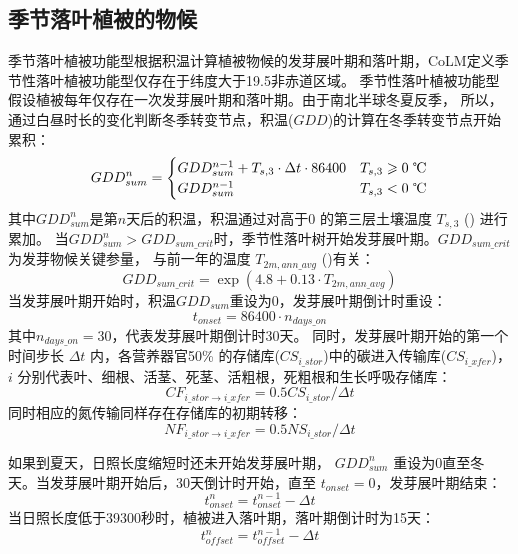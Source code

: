 \subsection{季节落叶植被的物候}\label{季节落叶植被的物候}
季节落叶植被功能型根据积温计算植被物候的发芽展叶期和落叶期，CoLM定义季节性落叶植被功能型仅存在于纬度大于19.5\textdegree 非赤道区域。
季节性落叶植被功能型假设植被每年仅存在一次发芽展叶期和落叶期。由于南北半球冬夏反季，
所以，通过白昼时长的变化判断冬季转变节点，积温($GDD$)的计算在冬季转变节点开始累积\citep{white1997continental}：
\begin{equation}
GDD _{sum}^{n}=\begin{cases}
GDD _{sum}^{n-1}+T_{s, 3} \cdot \Delta t \cdot 86400 & T_{s, 3} \geqslant \text{0 \textcelsius} \\ 
GDD _{sum}^{n-1} & T_{s, 3}< \text{0 \textcelsius}
\end{cases}
\end{equation}
其中$GDD_{sum}^n$是第$n$天后的积温，积温通过对高于0 \textcelsius 的第三层土壤温度 $T_{s,3}$ (\textcelsius) 进行累加。
当$GDD_{sum}^n>{GDD}_{sum\_{crit}}$时，季节性落叶树开始发芽展叶期。${GDD}_{sum\_{crit}}$ 为发芽物候关键参量，
与前一年的温度 $T_{2m,ann\_{avg}}$ (\textcelsius)有关：
\begin{equation}
GDD _{sum\_{crit}}=\exp \left(4.8+0.13 \cdot T_{2 m, ann\_{avg}}\right)
\end{equation}
当发芽展叶期开始时，积温${GDD}_{sum}$重设为0，发芽展叶期倒计时重设：
\begin{equation}
t_{onset}=86400 \cdot n_{days\_on}
\end{equation}
其中$n_{days\_on}=30$，代表发芽展叶期倒计时30天。
同时，发芽展叶期开始的第一个时间步长 $\Delta t$ 内，各营养器官50\% 的存储库($CS_{i\_{stor}}$)中的碳进入传输库($CS_{i\_{xfer}}$)，$i$ 分别代表叶、细根、活茎、死茎、活粗根，死粗根和生长呼吸存储库：
\begin{equation}
  CF_{i\_{stor}\rightarrow i\_{xfer}} = 0.5 CS_{i\_{stor}}/\Delta t
\end{equation}
同时相应的氮传输同样存在存储库的初期转移：
\begin{equation}
NF_{i\_{stor}\rightarrow i\_{xfer}} = 0.5  NS_{i\_{stor}}/\Delta t
\end{equation}

如果到夏天，日照长度缩短时还未开始发芽展叶期，
$GDD_{sum}^n$ 重设为0直至冬天。当发芽展叶期开始后，30天倒计时开始，直至 $t_{onset}=0$，发芽展叶期结束：
%
\begin{equation}
t_{onset}^n=t_{onset}^{n-1}-\Delta t
\end{equation}
当日照长度低于39300秒时，植被进入落叶期，落叶期倒计时为15天：
\begin{equation}
  t_{offset}^n=t_{offset}^{n-1}-\Delta t
\end{equation}


